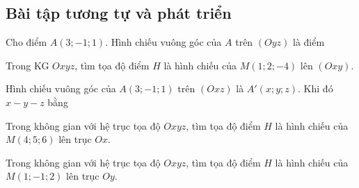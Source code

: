 \subsection{Bài tập tương tự và phát triển}
\setcounter{ex}{0}
\begin{ex}%
	Cho điểm $A(3;-1;1)$. Hình chiếu vuông góc của $A$ trên $(Oyz)$ là điểm
\end{ex}
\begin{ex}%
	Trong KG $Oxyz$, tìm tọa độ điểm $H$ là hình chiếu của $M(1;2;-4)$ lên $(Oxy)$.
\end{ex}
\begin{ex}%
	Hình chiếu vuông góc của $A(3;-1;1)$ trên $(Oxz)$ là $A'(x;y;z)$. Khi đó $x-y-z$ bằng
\end{ex}
\begin{ex}%
	Trong không gian với hệ trục tọa độ  $Oxyz$, tìm tọa độ điểm $H$ là hình chiếu của $M(4;5;6)$ lên trục $Ox$.
\end{ex}
\begin{ex}%
	Trong không gian với hệ trục tọa độ  $Oxyz$, tìm tọa độ điểm $H$ là hình chiếu của $M(1;-1;2)$ lên trục $Oy$.
\end{ex}

